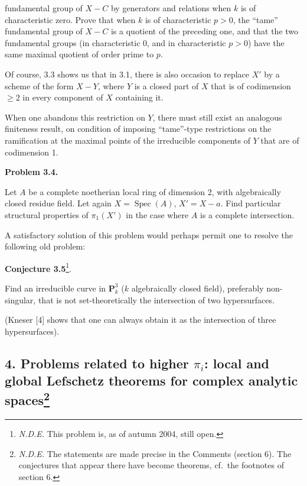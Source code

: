 \documentclass[
]{article}
\begin{document}
fundamental group of \(X - C\) by generators and relations when \(k\) is
of characteristic zero. Prove that when \(k\) is of characteristic
\(p > 0\), the ``tame'' fundamental group of \(X - C\) is a quotient of
the preceding one, and that the two fundamental groups (in
characteristic 0, and in characteristic \(p > 0\)) have the same maximal
quotient of order prime to \(p\).

Of course, 3.3 shows us that in 3.1, there is also occasion to replace
\(X'\) by a scheme of the form \(X - Y\), where \(Y\) is a closed part
of \(X\) that is of codimension \(\geqslant 2\) in every component of
\(X\) containing it.

When one abandons this restriction on \(Y\), there must still exist an
analogous finiteness result, on condition of imposing ``tame''-type
restrictions on the ramification at the maximal points of the
irreducible components of \(Y\) that are of codimension 1.

\textbf{Problem 3.4.}

Let \(A\) be a complete noetherian local ring of dimension 2, with
algebraically closed residue field. Let again
\(X = \operatorname{Spec}(A)\), \(X' = X - {a}\). Find particular
structural properties of \(\pi_{1}(X')\) in the case where \(A\) is a
complete intersection.

A satisfactory solution of this problem would perhaps permit one to
resolve the following old problem:

\textbf{Conjecture 3.5}\footnote{\emph{N.D.E.} This problem is, as of
  autumn 2004, still open.}.

Find an irreducible curve in \(\mathbf{P}^{3}_{k}\) (\(k\) algebraically
closed field), preferably non-singular, that is not set-theoretically
the intersection of two hypersurfaces.

(Kneser {[}4{]} shows that one can always obtain it as the intersection
of three hypersurfaces).

\subsection[4. Problems related to higher \(\pi_{i}\): local and global
Lefschetz theorems for complex analytic spaces]{\texorpdfstring{4.
Problems related to higher \(\pi_{i}\): local and global Lefschetz
theorems for complex analytic
spaces\footnote{\emph{N.D.E.} The statements are made precise in the
  Comments (section 6). The conjectures that appear there have become
  theorems, cf.~the footnotes of section 6.}}{4. Problems related to higher \textbackslash pi\_\{i\}: local and global Lefschetz theorems for complex analytic spaces}}\label{problems-related-to-higher-pi_i-local-and-global-lefschetz-theorems-for-complex-analytic-spacesn.d.e-xiii-11}
\end{document}
